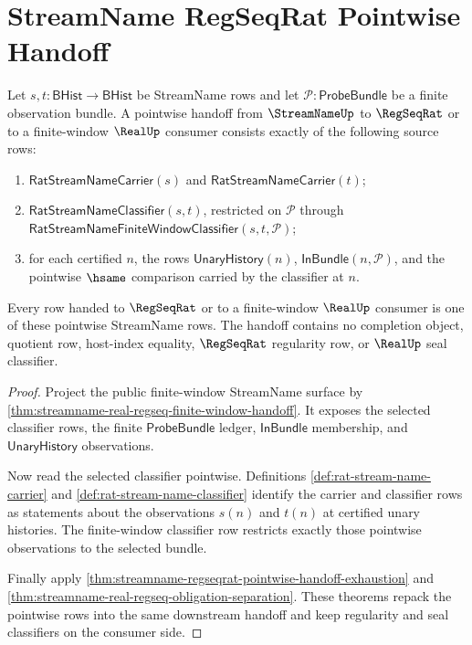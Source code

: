 \section{StreamName RegSeqRat Pointwise Handoff}
\label{sec:streamname-regseqrat-pointwise-handoff}

\begin{theorem}
\label{thm:streamname-regseqrat-pointwise-handoff}
Let $s,t:\mathsf{BHist}\to\mathsf{BHist}$ be StreamName rows and let
$\mathcal{P}:\mathsf{ProbeBundle}$ be a finite observation bundle. A
pointwise handoff from $\StreamNameUp$ to $\RegSeqRat$ or to a finite-window
$\RealUp$ consumer consists exactly of the following source rows:
\begin{enumerate}
  \item $\mathsf{RatStreamNameCarrier}(s)$ and
  $\mathsf{RatStreamNameCarrier}(t)$;
  \item $\mathsf{RatStreamNameClassifier}(s,t)$, restricted on
  $\mathcal{P}$ through
  $\mathsf{RatStreamNameFiniteWindowClassifier}(s,t,\mathcal{P})$;
  \item for each certified $n$, the rows
  $\mathsf{UnaryHistory}(n)$, $\mathsf{InBundle}(n,\mathcal{P})$, and the
  pointwise $\hsame$ comparison carried by the classifier at $n$.
\end{enumerate}
Every row handed to $\RegSeqRat$ or to a finite-window $\RealUp$ consumer is
one of these pointwise StreamName rows. The handoff contains no completion
object, quotient row, host-index equality, $\RegSeqRat$ regularity row, or
$\RealUp$ seal classifier.
\end{theorem}
\begin{proof}
Project the public finite-window StreamName surface by
\autoref{thm:streamname-real-regseq-finite-window-handoff}. It exposes the
selected classifier rows, the finite $\mathsf{ProbeBundle}$ ledger,
$\mathsf{InBundle}$ membership, and $\mathsf{UnaryHistory}$ observations.

Now read the selected classifier pointwise. Definitions
\autoref{def:rat-stream-name-carrier} and
\autoref{def:rat-stream-name-classifier} identify the carrier and classifier
rows as statements about the observations $s(n)$ and $t(n)$ at certified unary
histories. The finite-window classifier row restricts exactly those
pointwise observations to the selected bundle.

Finally apply
\autoref{thm:streamname-regseqrat-pointwise-handoff-exhaustion} and
\autoref{thm:streamname-real-regseq-obligation-separation}. These theorems
repack the pointwise rows into the same downstream handoff and keep
regularity and seal classifiers on the consumer side.
\end{proof}

